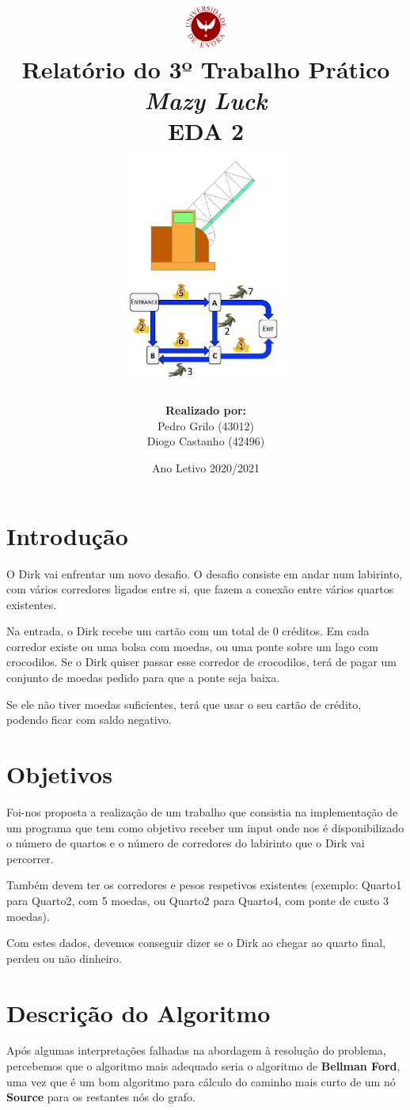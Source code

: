 \documentclass[11pt]{article}   %
\title
{   
    \includegraphics[width=0.1\textwidth]{images/logo_uni.png}
    \\[0.5cm]
    \textbf{Relatório do 3º Trabalho Prático} \\[0.1cm]
    \textit{Mazy Luck}\\[1cm]
    EDA 2\\[2cm]
    \includegraphics[width=0.40\textwidth]{images/mazy_luc_problem.png}\\[1.5cm]
}
\author
{
    \textbf{Realizado por:}\\[0.1cm] Pedro Grilo (43012) \\ Diogo Castanho (42496)\\[1cm]
}
\date{Ano Letivo 2020/2021}
\begin{document}
\maketitle

\section{Introdução} 
\hspace{0,5cm}O Dirk vai enfrentar um novo desafio. O desafio consiste em andar num labirinto, com vários corredores ligados entre si, que fazem a conexão entre vários quartos existentes.

Na entrada, o Dirk recebe um cartão com um total de 0 créditos. Em cada corredor existe ou uma bolsa com moedas, ou uma ponte sobre um lago com crocodilos. Se o Dirk quiser passar esse corredor de crocodilos, terá de pagar um conjunto de moedas pedido para que a ponte seja baixa. 

Se ele não tiver moedas suficientes, terá que usar o seu cartão de crédito, podendo ficar com saldo negativo.\\
\section{Objetivos}

\hspace{0,5cm}Foi-nos proposta a realização de um trabalho que consistia na implementação de um programa que tem como objetivo receber um input onde nos é disponibilizado o número de quartos e o número de corredores do labirinto que o Dirk vai percorrer.

Também devem ter os corredores e pesos respetivos existentes (exemplo: Quarto1 para Quarto2, com 5 moedas, ou Quarto2 para Quarto4, com ponte de custo 3 moedas).

Com estes dados, devemos conseguir dizer se o Dirk ao chegar ao quarto final, perdeu ou não dinheiro.\\
\section{Descrição do Algoritmo}
\hspace{0,5cm}Após algumas interpretações falhadas na abordagem à resolução do problema, percebemos que o algoritmo mais adequado seria o algoritmo de \textbf{Bellman Ford}, uma vez que é um bom algoritmo para cálculo do caminho mais curto de um nó \textbf{Source} para os restantes nós do grafo.
\end{document}
